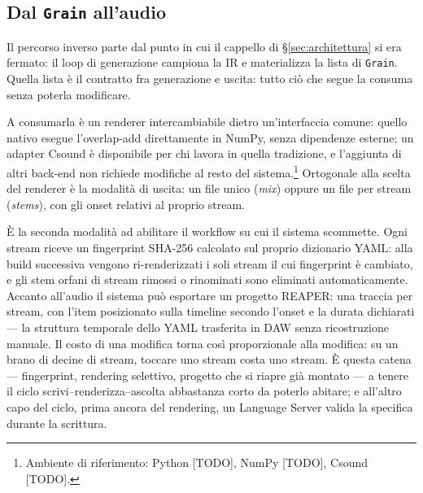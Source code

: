 %
%

\subsection{Dal \texttt{Grain} all'audio}\label{sec:render}

Il percorso inverso parte dal punto in cui il cappello di
\S\ref{sec:architettura} si era fermato: il loop di generazione campiona
la IR e materializza la lista di \texttt{Grain}. Quella lista è il
contratto fra generazione e uscita: tutto ciò che segue la consuma senza
poterla modificare.

A consumarla è un renderer intercambiabile dietro un'interfaccia comune:
quello nativo esegue l'overlap-add direttamente in NumPy, senza
dipendenze esterne; un adapter Csound è disponibile per chi lavora in
quella tradizione, e l'aggiunta di altri back-end non richiede modifiche
al resto del sistema.\footnote{Ambiente di riferimento: Python [TODO],
NumPy [TODO], Csound [TODO].} Ortogonale alla scelta del renderer è la
modalità di uscita: un file unico (\emph{mix}) oppure un file per stream
(\emph{stems}), con gli onset relativi al proprio stream.

È la seconda modalità ad abilitare il workflow su cui il sistema
scommette. Ogni stream riceve un fingerprint SHA-256 calcolato sul
proprio dizionario YAML: alla build successiva vengono ri-renderizzati i
soli stream il cui fingerprint è cambiato, e gli stem orfani di stream
rimossi o rinominati sono eliminati automaticamente. Accanto all'audio
il sistema può esportare un progetto REAPER: una traccia per stream, con
l'item posizionato sulla timeline secondo l'onset e la durata dichiarati
--- la struttura temporale dello YAML trasferita in DAW senza
ricostruzione manuale. Il costo di una modifica torna così proporzionale
alla modifica: su un brano di decine di stream, toccare uno stream
costa uno stream. È questa catena --- fingerprint, rendering selettivo,
progetto che si riapre già montato --- a tenere il ciclo
scrivi--renderizza--ascolta abbastanza corto da poterlo abitare; e
all'altro capo del ciclo, prima ancora del rendering, un Language Server
valida la specifica durante la scrittura.

